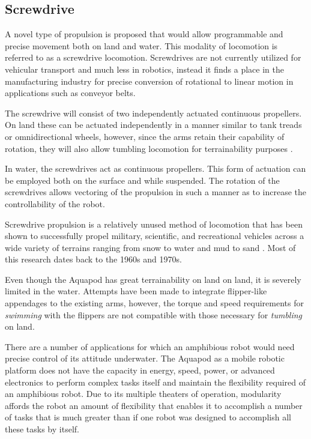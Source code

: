 \subsection{Screwdrive}

A novel type of propulsion is proposed that would allow programmable and precise
movement both on land and water. This modality of locomotion is referred to as a
screwdrive locomotion. Screwdrives are not currently utilized for vehicular
transport and much less in robotics, instead it finds a place in the
manufacturing industry for precise conversion of rotational to linear motion in
applications such as conveyor belts.


The screwdrive will consist of two independently actuated continuous propellers.
On land these can be actuated independently in a manner similar to tank treads
or omnidirectional wheels, however, since the arms retain their capability of
rotation, they will also allow tumbling locomotion for terrainability purposes .

In water, the screwdrives act as continuous propellers. This form of actuation
can be employed both on the surface and while suspended. The rotation of the
screwdrives allows vectoring of the propulsion in such a manner as to increase
the controllability of the robot.

Screwdrive propulsion is a relatively unused method of locomotion that has been
shown to successfully propel military, scientific, and recreational vehicles
across a wide variety of terrains ranging from snow to water and mud to sand
\cite{Fales1972, Cole1961c, Dugoff1967}. Most of this research dates back to the
1960s and 1970s.



Even though the Aquapod has great terrainability on
land \cite{Hemes2012} on land, it is severely limited in the water. Attempts
have been made to integrate flipper-like appendages to the existing arms,
however, the torque and speed requirements for \emph{swimming} with the flippers
are not compatible with those necessary for \emph{tumbling} on land.


There are a number of applications for which an amphibious robot would need
precise control of its attitude underwater. The Aquapod as a mobile robotic
platform does not have the capacity in energy, speed, power, or advanced
electronics to perform complex tasks itself and maintain the flexibility
required of an amphibious robot. Due to its multiple theaters of operation,
modularity affords the robot an amount of flexibility that enables it to
accomplish a number of tasks that is much greater than if one robot was designed
to accomplish all these tasks by itself.

